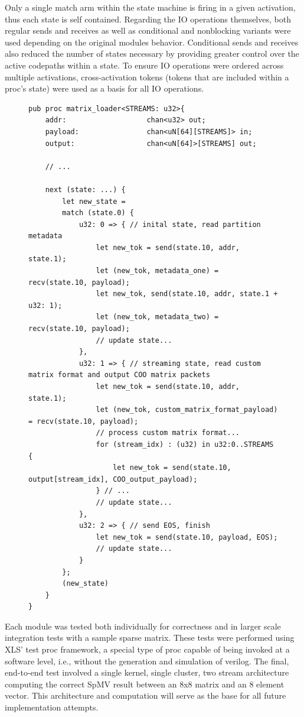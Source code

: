 Only a single match arm within the state machine is firing in a given activation, thus each state is self contained. Regarding the IO operations themselves, both regular sends and receives as well as conditional and nonblocking variants were used depending on the original modules behavior. Conditional sends and receives also reduced the number of states necessary by providing greater control over the active codepaths within a state. To ensure IO operations were ordered across multiple activations, cross-activation tokens\cite{xlsweb} (tokens that are included within a proc's state) were used as a basis for all IO operations.
\begin{figure}[H]
\begin{lstlisting}[label={idealmatrixloaderexample},caption={Initial design of the matrix loader. The initial state, streaming state, and cleanup state reside in separate match arms}, captionpos=b,style=mystyle]
pub proc matrix_loader<STREAMS: u32>{
    addr:                   chan<u32> out;
    payload:                chan<uN[64][STREAMS]> in;
    output:                 chan<uN[64]>[STREAMS] out;
    
    // ...

    next (state: ...) {
        let new_state =
        match (state.0) {
            u32: 0 => { // inital state, read partition metadata
                let new_tok = send(state.10, addr, state.1);
                let (new_tok, metadata_one) = recv(state.10, payload);
                let new_tok, send(state.10, addr, state.1 + u32: 1);
                let (new_tok, metadata_two) = recv(state.10, payload);
                // update state...
            },
            u32: 1 => { // streaming state, read custom matrix format and output COO matrix packets
                let new_tok = send(state.10, addr, state.1);
                let (new_tok, custom_matrix_format_payload) = recv(state.10, payload);
                // process custom matrix format...
                for (stream_idx) : (u32) in u32:0..STREAMS {
                    let new_tok = send(state.10, output[stream_idx], COO_output_payload);
                } // ...
                // update state...
            },
            u32: 2 => { // send EOS, finish
                let new_tok = send(state.10, payload, EOS);
                // update state...
            }
        };
        (new_state)
    }
}
\end{lstlisting}
\end{figure}

Each module was tested both individually for correctness and in larger scale integration tests with a sample sparse matrix. These tests were performed using XLS' test proc framework, a special type of proc capable of being invoked at a software level, i.e., without the generation and simulation of verilog. The final, end-to-end test involved a single kernel, single cluster, two stream architecture computing the correct SpMV result between an 8x8 matrix and an 8 element vector. This architecture and computation will serve as the base for all future implementation attempts.

